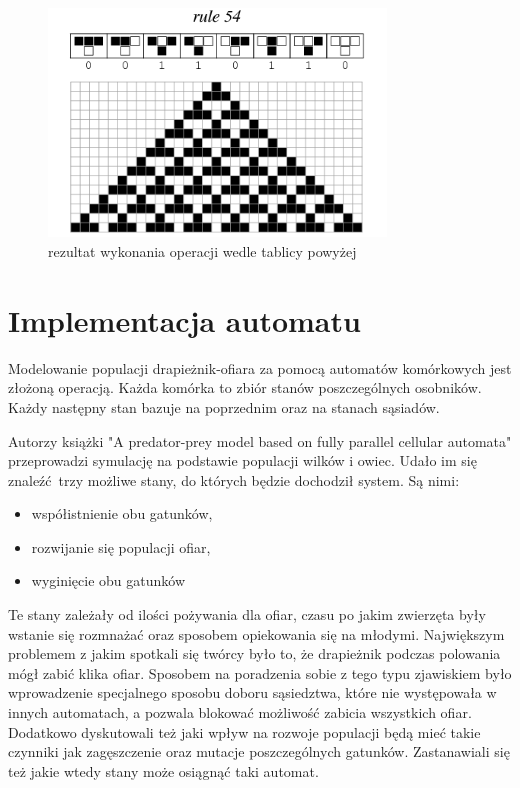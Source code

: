 \begin{figure}[ht]
	\centering
	\includegraphics[width=0.8\textwidth]{img/triangle}
	\caption{rezultat wykonania operacji wedle tablicy powyżej}
\end{figure}

\section{Implementacja automatu}

\noindent Modelowanie populacji drapieżnik-ofiara za pomocą automatów komórkowych jest złożoną operacją. Każda komórka to zbiór stanów poszczególnych osobników. Każdy następny stan bazuje na poprzednim oraz na stanach sąsiadów.

\noindent Autorzy książki "A predator-prey model based on fully parallel cellular automata" przeprowadzi symulację na podstawie populacji wilków i owiec. Udało im się znaleźć trzy możliwe stany, do których będzie dochodził system. Są nimi:

\begin{itemize}
	\item współistnienie obu gatunków,
	\item rozwijanie się populacji ofiar,
	\item wyginięcie obu gatunków
\end{itemize}

\noindent Te stany zależały od ilości pożywania dla ofiar, czasu po jakim zwierzęta były wstanie się rozmnażać oraz sposobem opiekowania się na młodymi. Największym problemem z jakim spotkali się twórcy było to, że drapieżnik podczas polowania mógł zabić klika ofiar. Sposobem na poradzenia sobie  z tego typu zjawiskiem było wprowadzenie specjalnego sposobu doboru sąsiedztwa, które nie występowała w innych  automatach, a pozwala blokować możliwość zabicia wszystkich ofiar.  Dodatkowo dyskutowali też jaki wpływ na rozwoje populacji będą mieć takie czynniki jak zagęszczenie oraz mutacje poszczególnych gatunków. Zastanawiali się też jakie wtedy stany może osiągnąć taki automat.